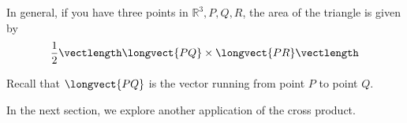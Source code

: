 In general, if you have three points in $\mathbb{R}^{3}, P,Q,R$, the area of the triangle is given by
\begin{equation*}
\frac{1}{2}\vectlength  \longvect{PQ} \times  \longvect{PR}  \vectlength 
\end{equation*}

Recall that $\longvect{PQ}$ is the vector running from point $P$ to point $Q$. 

\begin{center}
\end{center}

In the next section, we explore another application of the cross product.